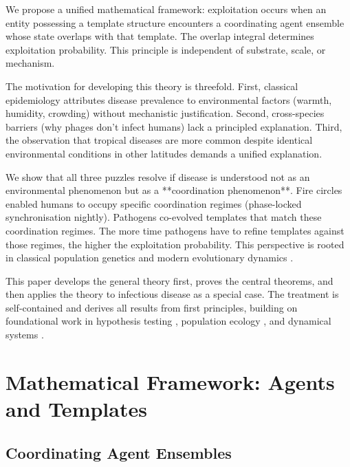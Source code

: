 \documentclass[11pt,twocolumn,a4paper]{article}
\begin{document}
We propose a unified mathematical framework: exploitation occurs when an entity possessing a template structure encounters a coordinating agent ensemble whose state overlaps with that template. The overlap integral determines exploitation probability. This principle is independent of substrate, scale, or mechanism.

The motivation for developing this theory is threefold. First, classical epidemiology \cite{kermack1927contribution,anderson1991infectious} attributes disease prevalence to environmental factors (warmth, humidity, crowding) without mechanistic justification. Second, cross-species barriers (why phages don't infect humans) lack a principled explanation. Third, the observation that tropical diseases are more common despite identical environmental conditions in other latitudes \cite{wolfe2007origins} demands a unified explanation.

We show that all three puzzles resolve if disease is understood not as an environmental phenomenon but as a **coordination phenomenon**. Fire circles enabled humans to occupy specific coordination regimes (phase-locked synchronisation nightly). Pathogens co-evolved templates that match these coordination regimes. The more time pathogens have to refine templates against those regimes, the higher the exploitation probability. This perspective is rooted in classical population genetics \cite{fisher1930genetical,haldane1949suggestions} and modern evolutionary dynamics \cite{maynard1982evolution,ewald1994evolution}.

This paper develops the general theory first, proves the central theorems, and then applies the theory to infectious disease as a special case. The treatment is self-contained and derives all results from first principles, building on foundational work in hypothesis testing \cite{neyman1933problem}, population ecology \cite{may1973stability}, and dynamical systems \cite{kurtz1970solutions}.

\section{Mathematical Framework: Agents and Templates}
\label{sec:framework}

\subsection{Coordinating Agent Ensembles}
\end{document}
